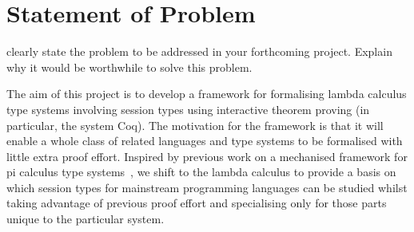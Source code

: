 \documentclass{mprop}
\begin{document}

\section{Statement of Problem}

clearly state the problem to be addressed in your forthcoming project. Explain
why it would be worthwhile to solve this problem.

The aim of this project is to develop a framework for formalising lambda
calculus type systems involving session types using interactive theorem
proving (in particular, the system Coq). The motivation for the framework is
that it will enable a whole class of related languages and type systems to be
formalised with little extra proof effort. Inspired by previous work on a
mechanised framework for pi calculus type systems~\cite{Gay:2001:FFP}, we
shift to the lambda calculus to provide a basis on which session types for
mainstream programming languages can be studied whilst taking advantage of
previous proof effort and specialising only for those parts unique to the
particular system.
\end{document}
